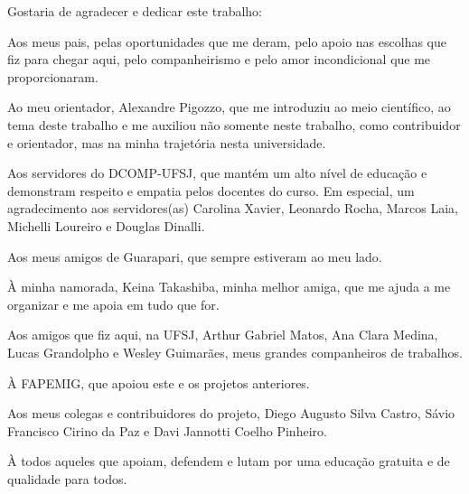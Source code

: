 \begin{agradecimentos}
Gostaria de agradecer e dedicar este trabalho:

\noindent
Aos meus pais, pelas oportunidades que me deram, pelo apoio nas escolhas que fiz para chegar aqui, pelo companheirismo e pelo amor incondicional que me proporcionaram.

\noindent
Ao meu orientador, Alexandre Pigozzo, que me introduziu ao meio científico, ao tema deste trabalho e me auxiliou não somente neste trabalho, como contribuidor e orientador, mas na minha trajetória nesta universidade.

\noindent
Aos servidores do DCOMP-UFSJ, que mantém um alto nível de educação e demonstram respeito e empatia pelos docentes do curso. Em especial, um agradecimento aos servidores(as) Carolina Xavier, Leonardo Rocha, Marcos Laia, Michelli Loureiro e Douglas Dinalli.

\noindent
Aos meus amigos de Guarapari, que sempre estiveram ao meu lado.

\noindent
À minha namorada, Keina Takashiba, minha melhor amiga, que me ajuda a me organizar e me apoia em tudo que for.

\noindent
Aos amigos que fiz aqui, na UFSJ, Arthur Gabriel Matos, Ana Clara Medina, Lucas Grandolpho e Wesley Guimarães, meus grandes companheiros de trabalhos.

\noindent
À FAPEMIG, que apoiou este e os projetos anteriores.

\noindent
Aos meus colegas e contribuidores do projeto, Diego Augusto Silva Castro, Sávio Francisco Cirino da Paz e Davi Jannotti Coelho Pinheiro.

\noindent
À todos aqueles que apoiam, defendem e lutam por uma educação gratuita e de qualidade para todos.
	
\end{agradecimentos}

\begin{epigrafe}
	\vspace*{\fill}
	\begin{flushright}

		
	\end{flushright}
\end{epigrafe}

